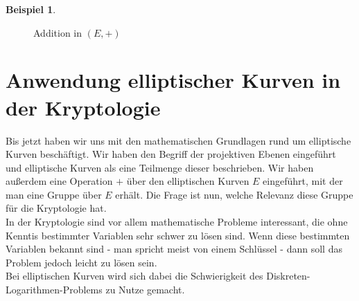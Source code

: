 \documentclass[hidelinks]{article}
\theoremstyle{plain}
\theoremstyle{definition}
\newtheorem{bsp}[thm]{Beispiel}
\theoremstyle{rem}
\begin{document}
\begin{sloppypar}
\begin{bsp}
\begin{figure}[H]
{}
        \caption{Addition in $(E, +)$}
    \end{figure}
\end{bsp}

\section{Anwendung elliptischer Kurven in der Kryptologie}
Bis jetzt haben wir uns mit den mathematischen Grundlagen rund um elliptische Kurven beschäftigt. Wir haben den Begriff der projektiven Ebenen eingeführt und elliptische Kurven als eine Teilmenge dieser beschrieben. 
Wir haben außerdem eine Operation $+$ über den elliptischen Kurven $E$ eingeführt, mit der man eine Gruppe über $E$ erhält.
Die Frage ist nun, welche Relevanz diese Gruppe für die Kryptologie hat. \\
In der Kryptologie sind vor allem mathematische Probleme interessant, die ohne Kenntis bestimmter Variablen sehr schwer zu lösen sind. Wenn diese bestimmten Variablen bekannt sind - man spricht meist von einem Schlüssel - dann soll das Problem jedoch leicht zu lösen sein. \\
Bei elliptischen Kurven wird sich dabei die Schwierigkeit des Diskreten-Logarithmen-Problems zu Nutze gemacht.

\end{sloppypar}
\end{document}
